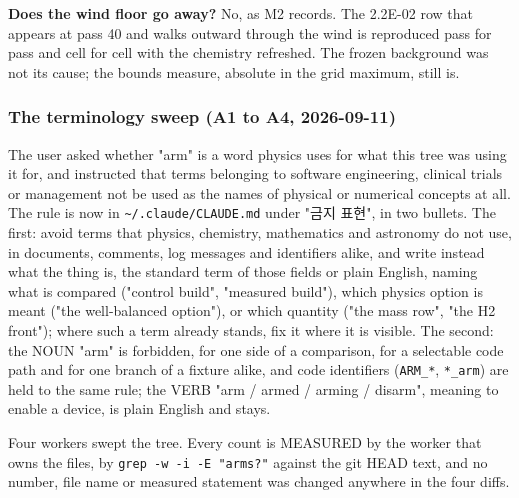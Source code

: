 \documentclass[english,a4paper]{my_memo}
\begin{document}
\textbf{Does the wind floor go away?} No, as M2 records. The 2.2E-02 row that appears
at pass 40 and walks outward through the wind is reproduced pass for pass and
cell for cell with the chemistry refreshed. The frozen background was not its
cause; the bound\textquotesingle s measure, absolute in the grid maximum, still is.

\subsubsection{The terminology sweep (A1 to A4, 2026-09-11)}\label{the-terminology-sweep-a1-to-a4-2026-09-11}

The user asked whether "arm" is a word physics uses for what this tree was using
it for, and instructed that terms belonging to software engineering, clinical
trials or management not be used as the names of physical or numerical concepts
at all. The rule is now in \texttt{\textasciitilde{}/.claude/CLAUDE.md} under "금지 표현", in two
bullets. The first: avoid terms that physics, chemistry, mathematics and
astronomy do not use, in documents, comments, log messages and identifiers
alike, and write instead what the thing is, the standard term of those fields or
plain English, naming what is compared ("control build", "measured build"),
which physics option is meant ("the well-balanced option"), or which quantity
("the mass row", "the H2 front"); where such a term already stands, fix it where
it is visible. The second: the NOUN "arm" is forbidden, for one side of a
comparison, for a selectable code path and for one branch of a fixture alike,
and code identifiers (\texttt{ARM\_*}, \texttt{*\_arm}) are held to the same rule; the VERB "arm
/ armed / arming / disarm", meaning to enable a device, is plain English and
stays.

Four workers swept the tree. Every count is MEASURED by the worker that owns the
files, by \texttt{grep\ -w\ -i\ -E\ "arms?"} against the git HEAD text, and no number, file
name or measured statement was changed anywhere in the four diffs.
\end{document}
